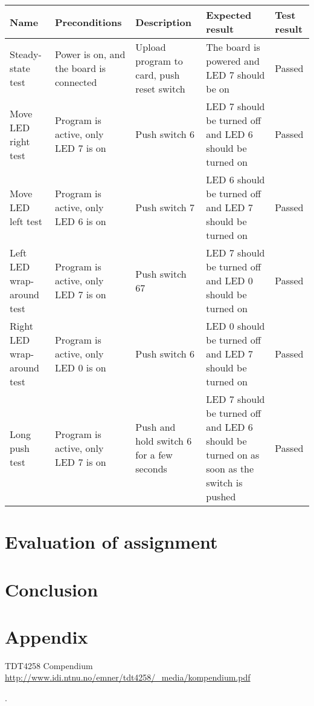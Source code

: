 \documentclass[a4paper,11pt]{article}
\begin{document}
\renewcommand{\arraystretch}{1.25} %
\begin{tabular}[pos]{|m{70pt}|m{90pt}|m{90pt}|m{100pt}|m{60pt}|}
\hline
\textbf{Name} 				& \textbf{Preconditions}				& \textbf{Description} 					& \textbf{Expected result} 													& \textbf{Test result} 		\\ \hline

Steady-state test			& Power is on, and the board is connected & Upload program to card, push reset switch 	& The board is powered and LED 7 should be on 									& Passed 				\\ \hline

Move LED right test			& Program is active, only LED 7 is on 		& Push switch 6						 	& LED 7 should be turned off and LED 6 should be turned on 							& Passed 				\\ \hline

Move LED left test			& Program is active, only LED 6 is on 		& Push switch 7						 	& LED 6 should be turned off and LED 7 should be turned on 							& Passed 				\\ \hline

Left LED wrap-around test		& Program is active, only LED 7 is on 		& Push switch 67					 	& LED 7 should be turned off and LED 0 should be turned on 							& Passed 				\\ \hline

Right LED wrap-around test	& Program is active, only LED 0 is on 		& Push switch 6						 	& LED 0 should be turned off and LED 7 should be turned on 							& Passed 				\\ \hline

Long push test				& Program is active, only LED 7 is on 		& Push and hold switch 6 for a few seconds 	& LED 7 should be turned off and LED 6 should be turned on as soon as the switch is pushed 	& Passed 				\\ \hline
\end{tabular}

\section{Evaluation of assignment}

\section{Conclusion}

\section{Appendix}

\footnotesize{  %
\begin{thebibliography}{N}

 TDT4258 Compendium
\url{http://www.idi.ntnu.no/emner/tdt4258/_media/kompendium.pdf}

\end{thebibliography}.  
}
\end{document}
